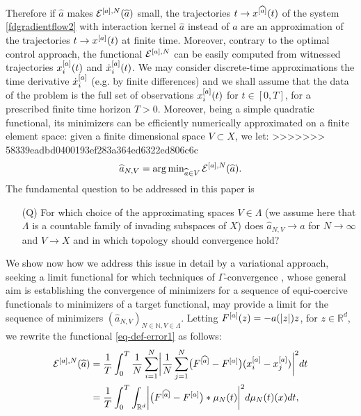 Therefore if $\widehat a$ makes $\mathcal E^{[a],N}(\widehat a)$ small, the trajectories $t\to x^{[\widehat a]}(t)$ of the system \eqref{fdgradientflow2} with interaction kernel $\widehat a$ instead of $a$ are an approximation of the trajectories $t \to x^{[a]}(t)$ at finite time. 
Moreover, contrary to the optimal control approach, the functional $\mathcal E^{[a],N}$ can be easily computed from witnessed trajectories $x^{[a]}_i(t)$ and $\dot{x}^{[a]}_i(t)$. We may consider discrete-time approximations the time derivative $\dot{x}^{[a]}_i$ (e.g. by finite differences) and we shall assume that the data of the problem is the full set of observations $x^{[a]}_i(t)$ for $t \in [0,T]$, for a prescribed finite time horizon $T>0$. Moreover, being a simple quadratic functional, its minimizers can be efficiently numerically approximated on a finite element space: given a finite dimensional space $V \subset X$, we let:
>>>>>>> 58339eadbd0400193ef283a364ed6322ed806c6c
\begin{equation}\label{fdproxy}
\widehat a_{N,V} = \operatorname{arg\,min}_{\widehat a \in V} \mathcal E^{[a],N}(\widehat a).
\end{equation}
The fundamental question to be addressed in this paper is
\begin{itemize}
\item[(Q)] For which choice of the approximating spaces $V \in \Lambda$ (we assume here that $\Lambda$ is a countable family of invading subspaces of $X$) does $\widehat a_{N,V} \to a$ for $N \to \infty$ and $V \to X$ and in which topology should convergence hold?
\end{itemize}
We show now how we address this issue in detail by a variational approach, seeking a limit functional for which techniques of $\Gamma$-convergence \cite{MR1201152}, whose general aim is establishing the convergence of minimizers for a sequence of equi-coercive functionals to minimizers of a target functional, may provide a limit for the sequence of minimizers $(\widehat a_{N,V})_{N \in \mathbb N, V \in \Lambda}$.
Letting $F^{[a]}(z) =-a(| z |)z$, for $z \in \mathbb R^{d}$, we rewrite the functional \eqref{eq-def-error1} as follows:
\begin{align}\label{pirlo}
	\begin{split}
	\mathcal E^{[a],N}(\widehat a) & = \frac{1}{T}\int_0^T\frac{1}{N}\sum_{i=1}^N\biggl|\frac{1}{N}\sum_{j=1}^N
			\bigl(F^{[\widehat a]}-F^{[a]}\bigr)(x^{[a]}_i-x^{[a]}_j)\biggr|^2 dt\\
			& = \frac{1}{T}\int_0^T \int_{\mathbb{R}^d} \biggl|\bigl(F^{[\widehat a]}-F^{[a]}\bigr)\ast\mu_N(t)\biggr|^2d\mu_N(t)(x)dt,
	\end{split}
\end{align}
